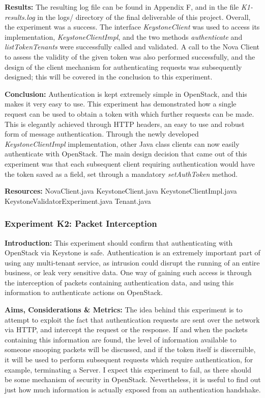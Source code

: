 \textbf{Results:}
The resulting log file can be found in Appendix F, and in the file \textit{K1-results.log} in the logs/ directory of the final deliverable of this project. 
Overall, the experiment was a success. The interface \textit{KeystoneClient} was used to access its implementation, \textit{KeystoneClientImpl}, and the two methods \textit{authenticate} and \textit{listTokenTenants} were successfully called and validated. 
A call to the Nova Client to assess the validity of the given token was also performed successfully, and the design of the client mechanism for authenticating requests was subsequently designed; this will be covered in the conclusion to this experiment. 

\textbf{Conclusion:}
Authentication is kept extremely simple in OpenStack, and this makes it very easy to use. This experiment has demonstrated how a single request can be used to obtain a token with which further requests can be made. This is elegantly achieved through HTTP headers, an easy to use and robust form of message authentication.  
Through the newly developed \textit{KeystoneClientImpl} implementation, other Java class clients can now easily authenticate with OpenStack. 
The main design decision that came out of this experiment was that each subsequent client requiring authentication would have the token saved as a field, set through a mandatory \textit{setAuthToken} method. 

\textbf{Resources:}
NovaClient.java
KeystoneClient.java
KeystoneClientImpl.java
KeystoneValidatorExperiment.java
Tenant.java


\subsubsection{Experiment K2: Packet Interception}
\textbf{Introduction:}
This experiment should confirm that authenticating with OpenStack via Keystone is safe. Authentication is an extremely important part of using any multi-tenant service, as intrusion could disrupt the running of an entire business, or leak very sensitive data. 
One way of gaining such access is through the interception of packets containing authentication data, and using this information to authenticate actions on OpenStack.

\textbf{Aims, Considerations \& Metrics:}
The idea behind this experiment is to attempt to exploit the fact that authentication requests are sent over the network via HTTP, and intercept the request or the response. If and when the packets containing this information are found, the level of information available to someone snooping packets will be discussed, and if the token itself is discernible, it will be used to perform subsequent requests which require authentication, for example, terminating a Server. 
I expect this experiment to fail, as there should be some mechanism of security in OpenStack. Nevertheless, it is useful to find out just how much information is actually exposed from an authentication handshake. 


